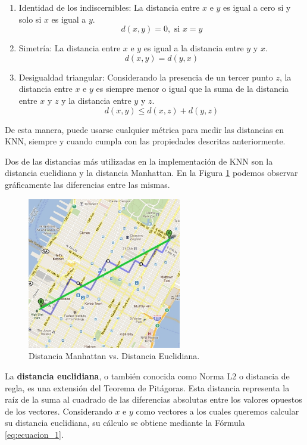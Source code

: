 \documentclass[12pt,a4paper]{article}
\begin{document}
\begin{sloppypar}
\begin{enumerate}
\item Identidad de los indiscernibles: La distancia entre $x$ e $y$ es igual a cero si y solo si $x$ es igual a $y$.
\[d(x,y) = 0, \text{   si  } x=y\]

\item Simetría: La distancia entre $x$ e $y$ es igual a la distancia entre $y$ y $x$.
$$d(x,y) = d(y,x)$$

\item Desigualdad triangular: Considerando la presencia de un tercer punto $z$, la distancia entre $x$ e $y$ es siempre menor o igual que la suma de la distancia entre $x$ y $z$ y la distancia entre $y$ y $z$. 
$$d(x,y) \leq d(x,z) + d(y,z)$$
\end{enumerate}

De esta manera, puede usarse cualquier métrica para medir las distancias en KNN, siempre y cuando cumpla con las propiedades descritas anteriormente.

Dos de las distancias más utilizadas en la implementación de KNN son la distancia euclidiana y la distancia Manhattan. En la Figura \ref{fig:Man_euc} podemos observar gráficamente las diferencias entre las mismas.

\begin{figure}[H]    %
 \centering
 \includegraphics[width=0.6\textwidth]{images/Manhattan_Euclidiana.png}
 \captionsetup{justification=centering,margin=2cm}
 \caption{Distancia Manhattan vs. Distancia Euclidiana\cite{apunte_uba}.} 
 \label{fig:Man_euc}
\end{figure}

La \textbf{distancia euclidiana}, o también conocida como Norma L2 o distancia de regla, es una extensión del Teorema de Pitágoras. Esta distancia representa la raíz de la suma al cuadrado de las diferencias absolutas entre los valores opuestos de los vectores. Considerando $x$ e $y$ como vectores a los cuales queremos calcular su distancia euclidiana, su cálculo se obtiene mediante la Fórmula \ref{eq:ecuacion_1}.


\end{sloppypar}
\end{document}
